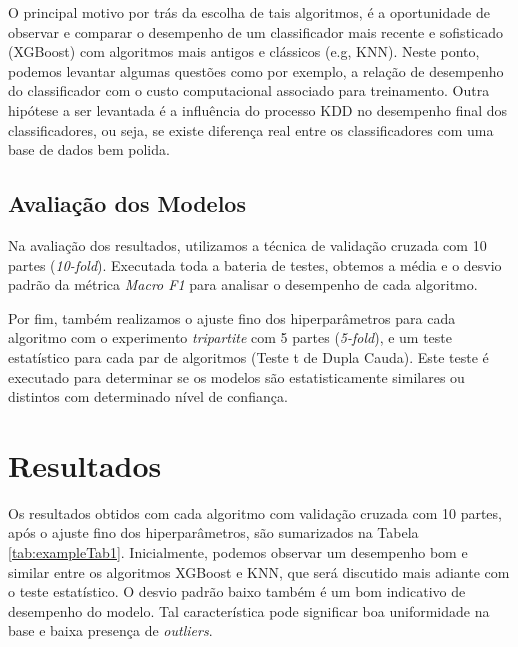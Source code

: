 \documentclass[manuscript,screen,review]{acmart}
\begin{document}
O principal motivo por trás da escolha de tais algoritmos, é a oportunidade de observar e comparar o desempenho de um classificador mais recente e sofisticado (XGBoost) com algoritmos mais antigos e clássicos (e.g, KNN). Neste ponto, podemos levantar algumas questões como por exemplo, a relação de desempenho do classificador com o custo computacional associado para treinamento. Outra hipótese a ser levantada é a influência do processo KDD no desempenho final dos classificadores, ou seja, se existe diferença real entre os classificadores com uma base de dados bem polida.

\subsection{Avaliação dos Modelos}

Na avaliação dos resultados, utilizamos a técnica de validação cruzada com 10 partes (\emph{10-fold}). Executada toda a bateria de testes, obtemos a média e o desvio padrão da métrica \emph{Macro F1} para analisar o desempenho de cada algoritmo.

Por fim, também realizamos o ajuste fino dos hiperparâmetros para cada algoritmo com o experimento \emph{tripartite} com 5 partes (\emph{5-fold}), e um teste estatístico para cada par de algoritmos (Teste t de Dupla Cauda). Este teste é executado para determinar se os modelos são estatisticamente similares ou distintos com determinado nível de confiança. 

\section{Resultados} \label{sec:4}

Os resultados obtidos com cada algoritmo com validação cruzada com 10 partes, após o ajuste fino dos hiperparâmetros, são sumarizados na Tabela \ref{tab:exampleTab1}. Inicialmente, podemos observar um desempenho bom e similar entre os algoritmos XGBoost e KNN, que será discutido mais adiante com o teste estatístico. O desvio padrão baixo também é um bom indicativo de desempenho do modelo. Tal característica pode significar boa uniformidade na base e baixa presença de \emph{outliers}.

\begin{table}[H]
    \centering
    \caption{\emph{Macro F1 Scores} alcançadas pelos algoritmos}
    \label{tab:exampleTab1}
    \vspace{0.2cm}
\end{table}
\end{document}
